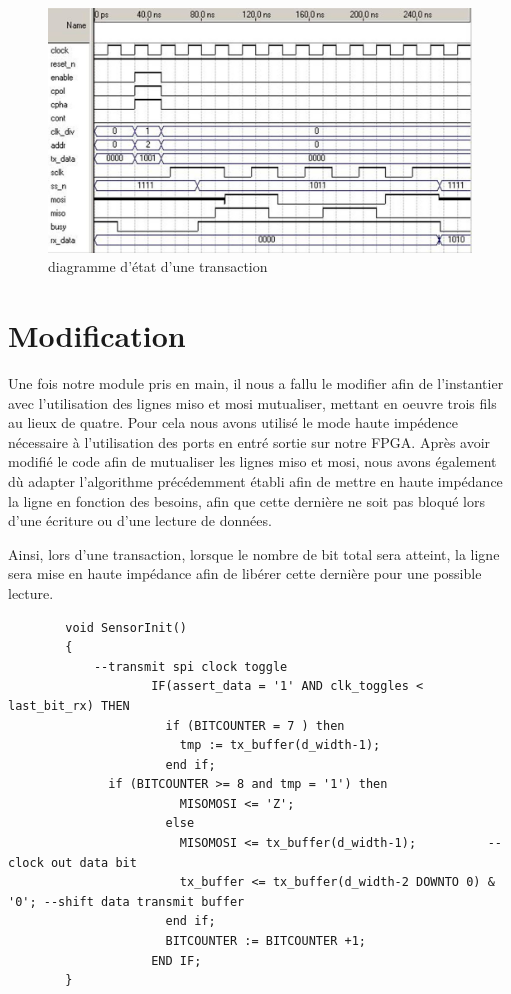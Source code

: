 \documentclass[french,a4paper,12pt]{report}
\begin{document}
	\begin{figure}[!ht]
    \center
  	\includegraphics[width=12cm]{transaction_timing_diagram_web.JPG}
    \caption{diagramme d'état d'une transaction}
	\end{figure}
	
	\section{Modification}
		Une fois notre module pris en main, il nous a fallu le modifier afin de l'instantier avec l'utilisation des lignes miso et mosi mutualiser, mettant en oeuvre trois fils au lieux de quatre. Pour cela nous avons utilisé le mode haute impédence nécessaire à l'utilisation des ports en entré sortie sur notre FPGA. Après avoir modifié le code afin de mutualiser les lignes miso et mosi, nous avons également dù adapter l'algorithme précédemment établi afin de mettre en haute impédance la ligne en fonction des besoins, afin que cette dernière ne soit pas bloqué lors d'une écriture ou d'une lecture de données. 
		
		Ainsi, lors d'une transaction, lorsque le nombre de bit total sera atteint, la ligne sera mise en haute impédance afin de libérer cette dernière pour une possible lecture.
		
	\begin{lstlisting}
 		void SensorInit()
		{
			--transmit spi clock toggle
					IF(assert_data = '1' AND clk_toggles < last_bit_rx) THEN
					  if (BITCOUNTER = 7 ) then
					  	tmp := tx_buffer(d_width-1);
					  end if;				
  	          if (BITCOUNTER >= 8 and tmp = '1') then
					  	MISOMOSI <= 'Z';				  
					  else 
					  	MISOMOSI <= tx_buffer(d_width-1);          --clock out data bit
					  	tx_buffer <= tx_buffer(d_width-2 DOWNTO 0) & '0'; --shift data transmit buffer				  
					  end if;				  
					  BITCOUNTER := BITCOUNTER +1;
					END IF;
		}
	\end{lstlisting}
	
\end{document}
